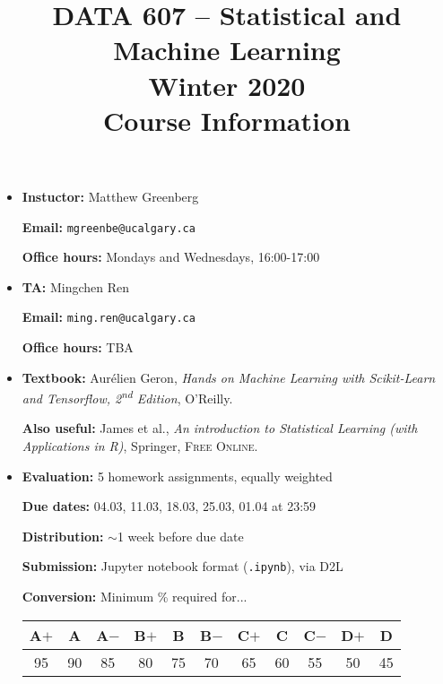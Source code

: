\documentclass{amsart}
\title[DATA 607]{DATA 607 -- Statistical and Machine Learning\\ Winter 2020\\Course Information}
\begin{document}
\maketitle

    \begin{itemize}
        \setlength\parskip{0.75em}
        \setlength\parindent{0em}
        \item \textbf{Instuctor:} Matthew Greenberg
        
        \textbf{Email:} \texttt{mgreenbe@ucalgary.ca}

        \textbf{Office hours:} Mondays and Wednesdays, 16:00-17:00

        \item \textbf{TA:} Mingchen Ren
        
        \textbf{Email:} \texttt{ming.ren@ucalgary.ca}
        
        \textbf{Office hours:} TBA

        \item \textbf{Textbook:} Aur\'elien Geron, \emph{Hands on Machine Learning with Scikit-Learn and Tensorflow, 2\textsuperscript{nd} Edition}, O'Reilly.
        
        \textbf{Also useful:} James et al., \emph{An introduction to Statistical Learning (with Applications in R)}, Springer, \textsc{Free Online}.


        \setlength\parskip{1em}
        \item \textbf{Evaluation:} 5 homework assignments, equally weighted
        
        \textbf{Due dates:} 04.03, 11.03, 18.03, 25.03, 01.04 at 23:59

        \textbf{Distribution:} $\sim$1 week before due date

        \textbf{Submission:} Jupyter notebook format (\texttt{.ipynb}), via D2L

        \textbf{Conversion:} Minimum \% required for...

        \begin{center}
        \begin{tabular}{c|c|c|c|c|c|c|c|c|c|c}
            A$+$&A&A$-$&B$+$&B&B$-$&C$+$&C&C$-$&D$+$&D\\\hline
            95&90&85&80&75&70&65&60&55&50&45
        \end{tabular}
    \end{center}
\end{itemize}
        
\end{document}
